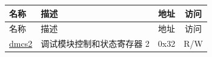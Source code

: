 \begin{longtable}{ | p{4.0cm} | p{8.4cm} | c | c| }
\hline\rowcolor{lightgray}
名称 & 描述 & 地址 & 访问 \\ \hline
\endfirsthead
\hline
\rowcolor{lightgray}
名称 & 描述 & 地址 & 访问  \\
\hline
\endhead
\endfoot

\hyperref[sec:riscvcpu-dmcs2-desc]{dmcs2} & 调试模块控制和状态寄存器 2 & 0x32 & R/W \\\hline
\end{longtable}
